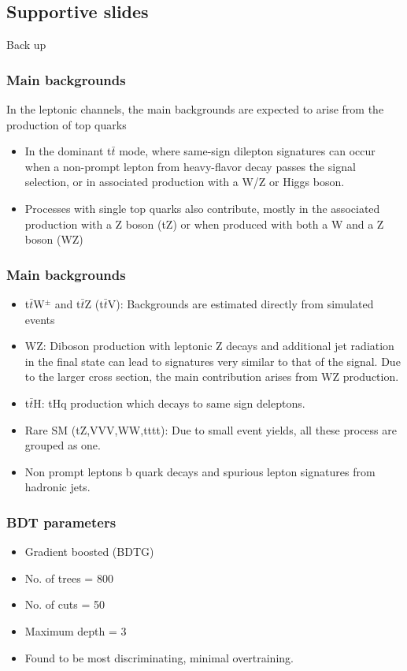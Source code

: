\documentclass[11pt]{beamer}
\begin{document}
\begin{frame}
\section{Supportive slides}
\huge{Back up}
\end{frame}

\begin{frame}
\frametitle{Main backgrounds}
In the leptonic channels, the main backgrounds are expected to
arise from the production of top quarks
\begin{itemize}
	\item In the dominant t$\bar{t}$ mode, where 
	same-sign dilepton signatures can occur when a non-prompt lepton from heavy-flavor
	decay passes the signal selection, or in associated production with a W/Z or Higgs boson.
	\item Processes with single top quarks also contribute, mostly in the associated production with a Z
	boson (tZ) or when produced with both a W and a Z boson (WZ) 
	
\end{itemize}
\end{frame}

\begin{frame}
\frametitle{Main backgrounds}
\begin{itemize}
\item t$\bar{t}$W$^\pm$ and t$\bar{t}$Z (t$\bar{t}$V): Backgrounds are estimated directly from simulated events%
\item WZ: Diboson production with leptonic Z decays and additional jet radiation in the final state can
lead to signatures very similar to that of the signal. Due to the larger cross section, the main
contribution arises from WZ production.
\item t$\bar{t}$H: tHq production which decays to same sign deleptons.
\item Rare SM (tZ,VVV,WW,tttt): Due to small event yields, all these process are grouped as one.
\item Non prompt leptons b quark decays and spurious lepton signatures from hadronic jets.
\end{itemize}
\end{frame}


\begin{frame}
\frametitle{BDT parameters}

\begin{itemize}
\item Gradient boosted (BDTG)
\item No. of trees = 800
\item No. of cuts = 50
\item Maximum depth = 3
\item Found to be most discriminating, minimal overtraining.
\end{itemize}
\end{frame}
\end{document}
